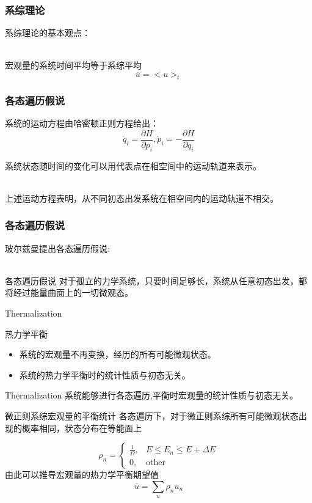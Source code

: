 \documentclass{beamer}
\begin{document}
\begin{frame}
\frametitle{系综理论}
\noindent
系综理论的基本观点：\\~\\
\begin{block}{宏观量的系统时间平均等于系综平均}
$$\overline{u} = <u>_t$$
\end{block}
\end{frame}
\begin{frame}
\frametitle{各态遍历假说}
系统的运动方程由哈密顿正则方程给出：
$$\dot{q}_i=\frac{\partial H}{\partial p_i},\dot{p}_i=-\frac{\partial H}{\partial q_i}$$

系统状态随时间的变化可以用代表点在相空间中的运动轨道来表示。\\~

\pause 上述运动方程表明，从不同初态出发系统在相空间内的运动轨道不相交。

\end{frame}

\begin{frame}
\frametitle{各态遍历假说}
\noindent
玻尔兹曼提出各态遍历假说:\\~

\begin{block}{各态遍历假说}
对于孤立的力学系统，只要时间足够长，系统从任意初态出发，都将经过能量曲面上的一切微观态。
\end{block}
\end{frame}

\begin{frame}{Thermalization}
\noindent

\begin{block}{热力学平衡}
\begin{itemize}
\item 系统的宏观量不再变换，经历的所有可能微观状态。
\item 系统的热力学平衡时的统计性质与初态无关。
\end{itemize}
\end{block}
\noindent
\begin{block}{Thermalization}
系统能够进行各态遍历,平衡时宏观量的统计性质与初态无关。
\end{block}
\end{frame}

\begin{frame}{微正则系综宏观量的平衡统计}
\noindent
各态遍历下，对于微正则系综所有可能微观状态出现的概率相同，状态分布在等能面上

$$
{\rho}_n=
\begin{cases}
\frac{1}{\Omega},&E\le E_n \le E+\Delta E\\
0, &\text{other}
\end{cases}
$$
由此可以推导宏观量的热力学平衡期望值
$$\overline{u}=\sum_{n}{\rho_n u_n}$$

\end{frame}
\end{document}
